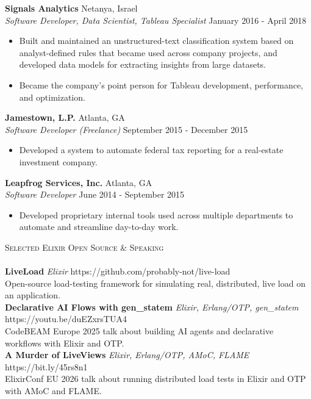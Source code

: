 \documentclass[a4paper]{article}
\newcommand{\lineunder} {
    \vspace*{-8pt} \\
    \hspace*{-18pt} \hrulefill \\
}
\newcommand{\header} [1] {
    {\hspace*{-18pt}\vspace*{6pt} \textsc{#1}}
    \vspace*{-6pt} \lineunder
}
\begin{document}
\textbf{Signals Analytics} \hfill Netanya, Israel\\
\textit{Software Developer, Data Scientist, Tableau Specialist} \hfill January 2016 - April 2018\\
\vspace{-1mm}
\begin{itemize} \itemsep 1pt
	\item Built and maintained an unstructured-text classification system based on analyst-defined rules that became used across company projects, and developed data models for extracting insights from large datasets.
	\item Became the company's point person for Tableau development, performance, and optimization.
\end{itemize}
\textbf{Jamestown, L.P.} \hfill Atlanta, GA\\
\textit{Software Developer (Freelance)} \hfill September 2015 - December 2015\\
\vspace{-1mm}
\begin{itemize} \itemsep 1pt
	\item Developed a system to automate federal tax reporting for a real-estate investment company.
\end{itemize}
\textbf{Leapfrog Services, Inc.} \hfill Atlanta, GA\\
\textit{Software Developer} \hfill June 2014 - September 2015\\
\vspace{-1mm}
\begin{itemize} \itemsep 1pt
	\item Developed proprietary internal tools used across multiple departments to automate and streamline day-to-day work.
\end{itemize}

\header{Selected Elixir Open Source \& Speaking}
{\textbf{LiveLoad}} {\sl Elixir} \hfill https://github.com/probably-not/live-load\\
Open-source load-testing framework for simulating real, distributed, live load on an application.\\
\vspace*{2mm}
{\textbf{Declarative AI Flows with gen\_statem}} {\sl Elixir, Erlang/OTP, gen\_statem} \hfill https://youtu.be/duEZxrsTUA4\\
CodeBEAM Europe 2025 talk about building AI agents and declarative workflows with Elixir and OTP.\\
\vspace*{2mm}
{\textbf{A Murder of LiveViews}} {\sl Elixir, Erlang/OTP, AMoC, FLAME} \hfill https://bit.ly/45rs8n1\\
ElixirConf EU 2026 talk about running distributed load tests in Elixir and OTP with AMoC and FLAME.\\
\vspace{1mm}
\end{document}
